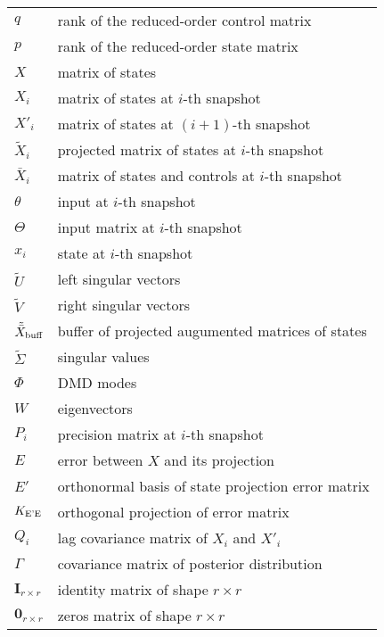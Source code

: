 \begin{longtable}{p{2cm}l}
	\(q\)                          & rank of the reduced-order control matrix                 \\
	\(p\)                          & rank of the reduced-order state matrix                   \\
	\(X\)                          & matrix of states                                         \\
	\(X_i\)                        & matrix of states at \(i\)-th snapshot                    \\
	\(X'_i\)                       & matrix of states at \((i+1)\)-th snapshot                \\
	\(\tilde{X}_i\)                & projected matrix of states at \(i\)-th snapshot          \\
	\(\bar{X}_i\)                  & matrix of states and controls at \(i\)-th snapshot       \\
	\(\theta \)                    & input at \(i\)-th snapshot                               \\
	\(\Theta \)                    & input matrix at \(i\)-th snapshot                        \\
	\(x_i\)                        & state at \(i\)-th snapshot                               \\
	\(\tilde{U}\)                  & left singular vectors                                    \\
	\(\tilde{V}\)                  & right singular vectors                                   \\
	\(\tilde{\bar{X}} _{\text{buff}}\) & buffer of projected augumented matrices of states        \\
	\(\tilde{\Sigma} \)            & singular values                                          \\
	\(\Phi \)                      & DMD modes                                                \\
	\( W \)                        & eigenvectors                                             \\
	\(P_i\)                        & precision matrix at \(i\)-th snapshot                    \\
	\(E\)                          & error between \(X\) and its projection                   \\
	\(E'\)                         & orthonormal basis of state projection error matrix       \\
	\(K _{\text{E'E}}\)                & orthogonal projection of error matrix                    \\
	\(Q_i\)                        & lag covariance matrix of \(X_i\) and \(X'_i\)            \\
	\(\Gamma \)                    & covariance matrix of posterior distribution              \\
	\(\textbf{I}_{r \times r}\)    & identity matrix of shape \(r \times r\)                  \\
	\(\mathbf{0}_{r \times r}\)    & zeros matrix of shape \(r \times r\)                     \\
	\bottomrule
\end{longtable}

